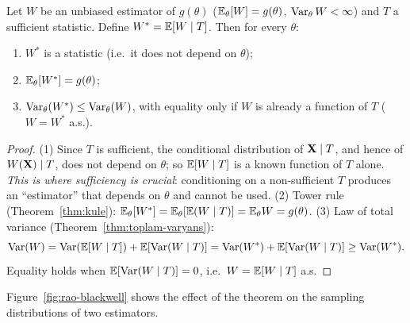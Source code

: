 \documentclass[main.tex]{subfiles}
\begin{document}
\begin{theorem}\label{thm:rao-blackwell}
Let $W$ be an unbiased estimator of $g(\theta)$ ($\mathbb{E}_\theta[W] = g(\theta)$, $\operatorname{Var}_\theta W<\infty$) and $T$ a sufficient statistic. Define $W^* = \mathbb{E}[W \mid T]$. Then for every $\theta$:
\begin{enumerate}
  \item $W^*$ is a statistic (i.e.\ it does not depend on $\theta$);
  \item $\mathbb{E}_\theta[W^*] = g(\theta)$;
  \item $\operatorname{Var}_\theta(W^*) \le \operatorname{Var}_\theta(W)$, with equality only if $W$ is already a function of $T$ ($W=W^*$ a.s.).
\end{enumerate}
\end{theorem}
\begin{proof}
(1) Since $T$ is sufficient, the conditional distribution of $\mathbf{X}\mid T$, and hence of $W(\mathbf{X})\mid T$, does not depend on $\theta$; so $\mathbb{E}[W\mid T]$ is a known function of $T$ alone. \emph{This is where sufficiency is crucial}: conditioning on a non-sufficient $T$ produces an ``estimator'' that depends on $\theta$ and cannot be used.
(2) Tower rule (Theorem~\ref{thm:kule}): $\mathbb{E}_\theta[W^*]=\mathbb{E}_\theta[\mathbb{E}(W\mid T)]=\mathbb{E}_\theta W=g(\theta)$.
(3) Law of total variance (Theorem~\ref{thm:toplam-varyans}):
\[
\operatorname{Var}(W) = \operatorname{Var}(\mathbb{E}[W \mid T]) + \mathbb{E}[\operatorname{Var}(W \mid T)] = \operatorname{Var}(W^*) + \mathbb{E}[\operatorname{Var}(W \mid T)] \ge \operatorname{Var}(W^*).
\]
Equality holds when $\mathbb{E}[\operatorname{Var}(W\mid T)]=0$, i.e.\ $W=\mathbb{E}[W\mid T]$ a.s.
\end{proof}

Figure~\ref{fig:rao-blackwell} shows the effect of the theorem on the sampling distributions of two estimators.
\end{document}
